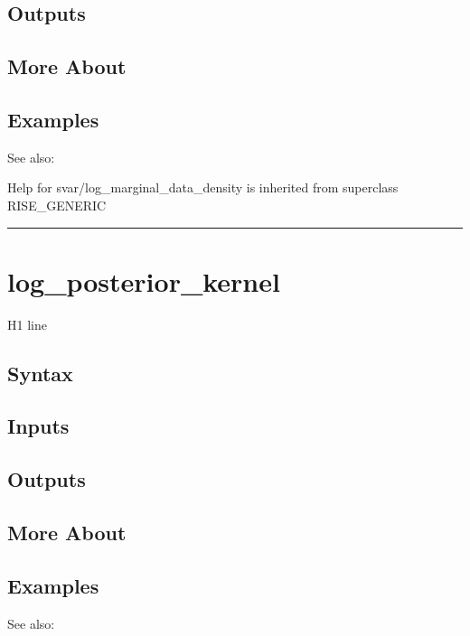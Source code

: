 \documentclass[letterpaper,10pt,english]{sphinxmanual}
\begin{document}
\subsection{Outputs}
\label{classes/models/@svar/svar:id58}

\subsection{More About}
\label{classes/models/@svar/svar:id59}

\subsection{Examples}
\label{classes/models/@svar/svar:id60}
See also:

Help for svar/log\_marginal\_data\_density is inherited from superclass RISE\_GENERIC


\bigskip\hrule{}\bigskip



\section{log\_posterior\_kernel}
\label{classes/models/@svar/svar:log-posterior-kernel}\label{classes/models/@svar/svar:id61}
H1 line


\subsection{Syntax}
\label{classes/models/@svar/svar:id62}

\subsection{Inputs}
\label{classes/models/@svar/svar:id63}

\subsection{Outputs}
\label{classes/models/@svar/svar:id64}

\subsection{More About}
\label{classes/models/@svar/svar:id65}

\subsection{Examples}
\label{classes/models/@svar/svar:id66}
See also:
\end{document}
